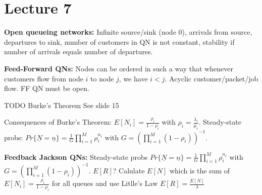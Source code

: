 \section{Lecture 7}
\textbf{Open queueing networks:} Infinite source/sink (node 0), arrivals from source,
departures to sink, number of customers in QN is not constant, stability if number of arrivals equals number of departures.

\textbf{Feed-Forward QNs:} Nodes can be ordered in such a way that whenever customers flow from node $i$ to node $j$, we have $i < j$. Acyclic customer/packet/job flow. FF QN must be open.

TODO Burke's Theorem See slide 15

Consequences of Burke's Theorem: $E[N_{i}] = \frac{\rho_i}{1-\rho_i}$ with $\rho_i = \frac{\lambda_i}{\mu_{i}}$.
Steady-state probs: $Pr\{\underline{N} = \underline{n}\} = \frac{1}{G}\prod^{M}_{i=1}\rho_{i}^{n_{i}}$ with $G = (\prod^{M}_{i=1} (1-\rho_{i}))^{-1}$.


\textbf{Feedback Jackson QNs:} Steady-state probs $Pr\{\underline{N} = \underline{n}\} = \frac{1}{G}\prod^{M}_{i=1}\rho_{i}^{n_{i}}$ with $G = (\prod^{M}_{i=1} (1-\rho_{i}))^{-1}$.
$E[R]$? Calulate $E[N]$ which is the sum of $E[N_i] = \frac{\rho_i}{1-\rho_i}$ for all queues and use Litlle's Law $E[R] = \frac{E[N]}{\lambda}$


